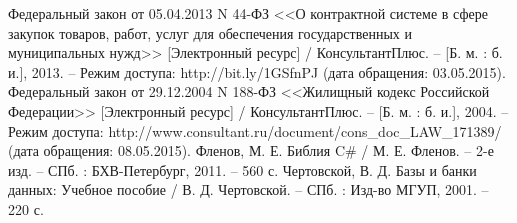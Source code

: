 \begin{thebibliography}{99}
	 Федеральный закон от 05.04.2013 N 44-ФЗ <<О контрактной системе в сфере закупок товаров, работ, услуг для обеспечения государственных и муниципальных нужд>> [Электронный ресурс] / КонсультантПлюс. – [Б. м. : б. и.], 2013. – Режим доступа: http://bit.ly/1GSfnPJ (дата обращения: 03.05.2015).
	 Федеральный закон от 29.12.2004 N 188-ФЗ <<Жилищный кодекс Российской Федерации>> [Электронный ресурс] / КонсультантПлюс. – [Б. м. : б. и.], 2004. – Режим доступа: http://www.consultant.ru/document/cons\_doc\_LAW\_171389/ (дата обращения: 08.05.2015).
	 Фленов, М. Е. Библия C\# / М. Е. Фленов. – 2-е изд. – СПб. : БХВ-Петербург, 2011. – 560 с.
	 Чертовской, В. Д. Базы и банки данных: Учебное пособие / В. Д. Чертовской. – СПб. : Изд-во МГУП, 2001. –  220 с.
\end{thebibliography}


\clearpage
\newpage